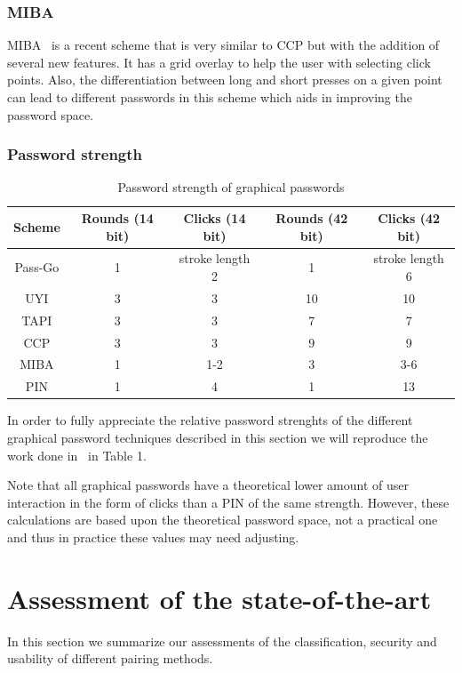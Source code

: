 \documentclass[conference, 11pt]{sty/IEEEtran}
\begin{document}
\subsubsection{MIBA}
\label{sssec:miba}

MIBA~\cite{ritter2013miba} is a recent scheme that is very similar to CCP but with the addition of several new features.
It has a grid overlay to help the user with selecting click points.
Also, the differentiation between long and short presses on a given point can lead to different passwords in this scheme which aids in improving the password space.

\subsubsection{Password strength}
\label{sssec:password_strength}

\begin{table}[t]
    \centering
    \normalsize{
    \begin{tabular}{c c c c c}
        Scheme & Rounds (14 bit) & Clicks (14 bit) & Rounds (42 bit) & Clicks (42 bit) \\
        \hline
        Pass-Go & 1 & stroke length 2 & 1 & stroke length 6 \\
        UYI & 3 & 3 & 10 & 10 \\
        TAPI & 3 & 3 & 7 & 7 \\
        CCP & 3 & 3 & 9 & 9 \\
        MIBA & 1 & 1-2 & 3 & 3-6 \\
        PIN & 1 & 4 & 1 & 13 \\
    \end{tabular}
    }
    \label{fig:pw}
    \caption{Password strength of graphical passwords}
\end{table}

In order to fully appreciate the relative password strenghts of the different graphical password techniques described in this section we will reproduce the work done in~\cite{schaub2013exploring} in 
Table 1.

Note that all graphical passwords have a theoretical lower amount of user interaction in the form of clicks than a PIN of the same strength.
However, these calculations are based upon the theoretical password space, not a practical one and thus in practice these values may need adjusting.

\section{Assessment of the state-of-the-art}
\label{sec:assessment_of_the_state_of_the_art}
In this section we summarize our assessments of the classification, security and usability of different pairing methods.
\end{document}
